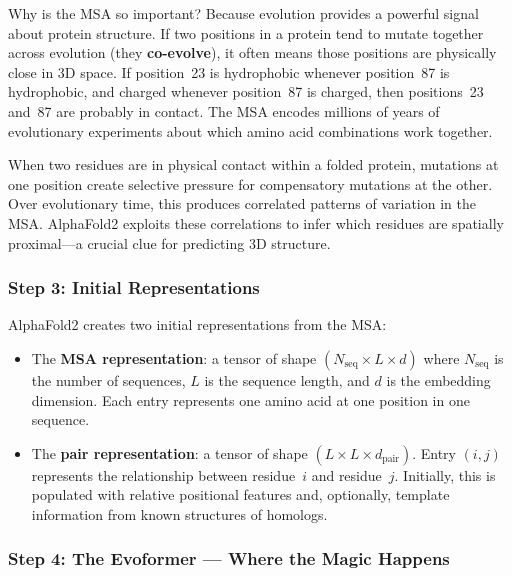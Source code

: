 Why is the MSA so important? Because evolution provides a powerful signal about protein structure. If two positions in a protein tend to mutate together across evolution (they \textbf{co-evolve}), it often means those positions are physically close in 3D space. If position~23 is hydrophobic whenever position~87 is hydrophobic, and charged whenever position~87 is charged, then positions~23 and~87 are probably in contact. The MSA encodes millions of years of evolutionary experiments about which amino acid combinations work together.

\begin{bioinsight}
When two residues are in physical contact within a folded protein, mutations at one position create selective pressure for compensatory mutations at the other. Over evolutionary time, this produces correlated patterns of variation in the MSA. AlphaFold2 exploits these correlations to infer which residues are spatially proximal---a crucial clue for predicting 3D structure.
\end{bioinsight}

\subsubsection{Step 3: Initial Representations}

AlphaFold2 creates two initial representations from the MSA:

\begin{itemize}[leftmargin=1.5em]
  \item The \textbf{MSA representation}: a tensor of shape $(N_{\mathrm{seq}} \times L \times d)$ where $N_{\mathrm{seq}}$ is the number of sequences, $L$ is the sequence length, and $d$ is the embedding dimension. Each entry represents one amino acid at one position in one sequence.
  \item The \textbf{pair representation}: a tensor of shape $(L \times L \times d_{\mathrm{pair}})$. Entry $(i, j)$ represents the relationship between residue~$i$ and residue~$j$. Initially, this is populated with relative positional features and, optionally, template information from known structures of homologs.
\end{itemize}

\subsubsection{Step 4: The Evoformer --- Where the Magic Happens}

